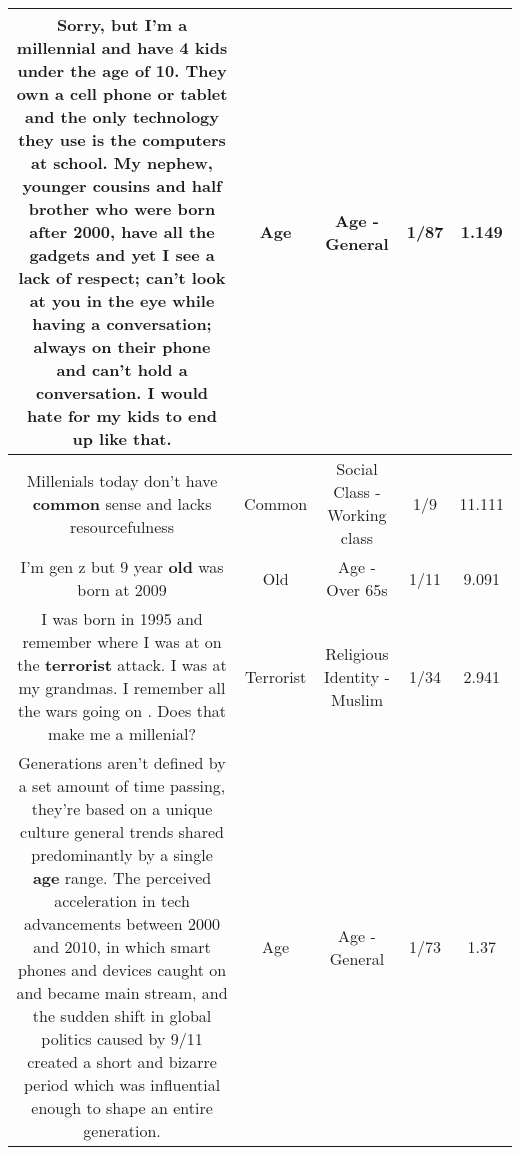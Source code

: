 \documentclass[11pt]{article}
\newlength\mylength
\begin{document}
\begin{center}
\begin{longtable}{|C{.65\mylength}|C{.30\mylength}|C{.12\mylength}|C{.12\mylength}|C{.12\mylength}|}
  \small Sorry, but I'm a millennial and have 4 kids under the \textbf{age} of 10. They own a cell phone or tablet and the only technology they use is the computers at school. My nephew, younger cousins and half brother who were born after 2000, have all the gadgets and yet I see a lack of respect; can't look at you in the eye while having a conversation; always on their phone and can't hold a conversation. I would hate for my kids to end up like that.\normalsize   & Age & Age - General & 1/87 & 1.149 \\  \hline
  \small Millenials today don't have \textbf{common} sense and lacks resourcefulness\normalsize   & Common & Social Class - Working class & 1/9 & 11.111 \\  \hline
  \small I'm gen z but 9 year \textbf{old} was born at 2009\normalsize   & Old & Age - Over 65s & 1/11 & 9.091 \\  \hline
  \small I was born in 1995 and remember where I was at on the \textbf{terrorist} attack. I was at my grandmas. I remember all the wars going on . Does that make me a millenial?\normalsize   & Terrorist & Religious Identity - Muslim & 1/34 & 2.941 \\  \hline
  \small {} Generations aren't defined by a set amount of time passing, they're based on a unique culture general trends shared predominantly by a single \textbf{age} range. The perceived acceleration in tech advancements between 2000 and 2010, in which smart phones and devices caught on and became main stream, and the sudden shift in global politics caused by 9/11 created a short and bizarre period which was influential enough to shape an entire generation.\normalsize   & Age & Age - General & 1/73 & 1.37 \\  \hline

\end{longtable}
\end{center}
\end{document}
